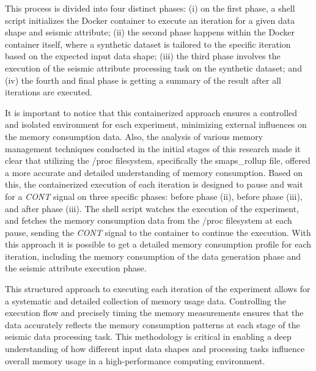 This process is divided into four distinct phases:
(i) on the first phase, a shell script initializes the Docker container to execute an iteration for a given data shape and seismic attribute;
(ii) the second phase happens within the Docker container itself, where a synthetic dataset is tailored to the specific iteration based on the expected input data shape;
(iii) the third phase involves the execution of the seismic attribute processing task on the synthetic dataset; and
(iv) the fourth and final phase is getting a summary of the result after all iterations are executed.

It is important to notice that this containerized approach ensures a controlled and isolated environment for each experiment, minimizing external influences on the memory consumption data.
Also, the analysis of various memory management techniques conducted in the initial stages of this research made it clear that utilizing the /proc filesystem, specifically the smaps\_rollup file, offered a more accurate and detailed understanding of memory consumption.
Based on this, the containerized execution of each iteration is designed to pause and wait for a \textit{CONT} signal on three specific phases: before phase (ii), before phase (iii), and after phase (iii).
The shell script watches the execution of the experiment, and fetches the memory consumption data from the /proc filesystem at each pause, sending the \textit{CONT} signal to the container to continue the execution.
With this approach it is possible to get a detailed memory consumption profile for each iteration, including the memory consumption of the data generation phase and the seismic attribute execution phase.

This structured approach to executing each iteration of the experiment allows for a systematic and detailed collection of memory usage data.
Controlling the execution flow and precisely timing the memory measurements ensures that the data accurately reflects the memory consumption patterns at each stage of the seismic data processing task.
This methodology is critical in enabling a deep understanding of how different input data shapes and processing tasks influence overall memory usage in a high-performance computing environment.




